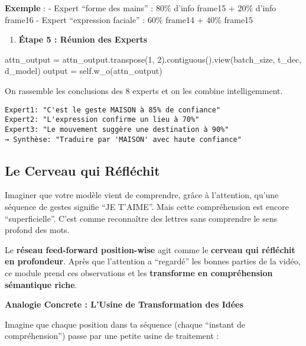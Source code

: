 \documentclass[12pt]{article}
\providecommand{\tightlist}{%
      \setlength{\itemsep}{0pt}\setlength{\parskip}{0pt}}
\newenvironment{Shaded}{}{}
\newcommand{\DecValTok}[1]{\textcolor[rgb]{0.25,0.63,0.44}{{#1}}}
\newcommand{\NormalTok}[1]{{#1}}
\newcommand{\VariableTok}[1]{\textcolor[rgb]{0.10,0.09,0.49}{{#1}}}
\newcommand{\OperatorTok}[1]{\textcolor[rgb]{0.40,0.40,0.40}{{#1}}}
\begin{document}
\textbf{Exemple} : - Expert ``forme des mains'' : 80\% d'info frame15 +
20\% d'info frame16 - Expert ``expression faciale'' : 60\% frame14 +
40\% frame15

\begin{enumerate}
\def\labelenumi{\arabic{enumi}.}
\setcounter{enumi}{4}
\tightlist
\item
  \textbf{Étape 5 : Réunion des Experts}
\end{enumerate}

\begin{Shaded}
\begin{Highlighting}[]
\NormalTok{attn\_output }\OperatorTok{=}\NormalTok{ attn\_output.transpose(}\DecValTok{1}\NormalTok{, }\DecValTok{2}\NormalTok{).contiguous().view(batch\_size, t\_dec, d\_model)}
\NormalTok{output }\OperatorTok{=} \VariableTok{self}\NormalTok{.w\_o(attn\_output)}
\end{Highlighting}
\end{Shaded}

On rassemble les conclusions des 8 experts et on les combine
intelligemment.

\begin{verbatim}
Expert1: "C'est le geste MAISON à 85% de confiance"
Expert2: "L'expression confirme un lieu à 70%"  
Expert3: "Le mouvement suggère une destination à 90%"
→ Synthèse: "Traduire par 'MAISON' avec haute confiance"
\end{verbatim}

    \subsection{Le Cerveau qui
Réfléchit}\label{le-cerveau-qui-ruxe9fluxe9chit}

Imaginer que votre modèle vient de comprendre, grâce à l'attention,
qu'une séquence de gestes signifie ``JE T'AIME''. Mais cette
compréhension est encore ``superficielle''. C'est comme reconnaître des
lettres sans comprendre le sens profond des mots.

Le \textbf{réseau feed-forward position-wise} agit comme le
\textbf{cerveau qui réfléchit en profondeur}. Après que l'attention a
``regardé'' les bonnes parties de la vidéo, ce module prend ces
observations et les \textbf{transforme en compréhension sémantique
riche}.

\textbf{Analogie Concrete : L'Usine de Transformation des Idées}

Imagine que chaque position dans ta séquence (chaque ``instant de
compréhension'') passe par une petite usine de traitement :
\end{document}

